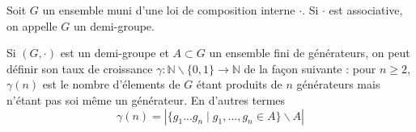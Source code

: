 \documentclass{scrartcl}
\begin{document}
\begin{flushleft}
\begin{define}
    Soit $G$ un ensemble muni d'une loi de composition interne $\cdot$. Si $\cdot$ est associative, on appelle $G$ un demi-groupe.
\end{define}

\begin{define}
    Si $(G, \cdot)$ est un demi-groupe et $A \subset G$ un ensemble fini de générateurs, on peut définir son taux de croissance
    $\gamma : \mathbb{N} \backslash \{0, 1\} \rightarrow \mathbb{N}$ de la façon suivante : pour $n \geq 2$, $\gamma(n)$ est le nombre d'élements
    de $G$ étant produits de $n$ générateurs mais n'étant pas soi même un générateur. En d'autres termes
    \[ \gamma(n) = |\{ g_1 ... g_n \mid g_1, ..., g_n \in A \} \backslash A| \]
\end{define}


\end{flushleft}
\end{document}
